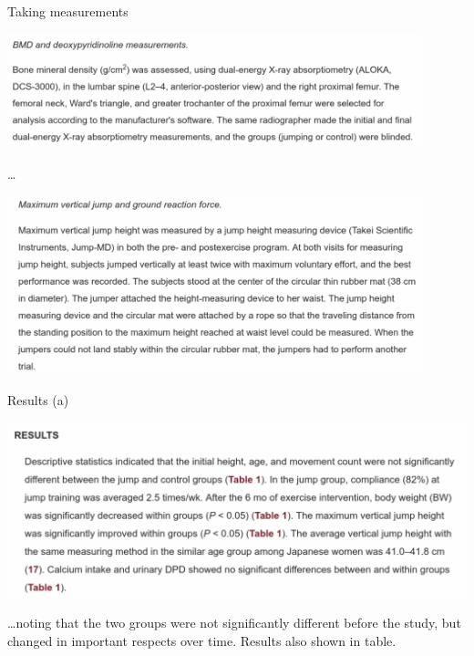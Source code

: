\documentclass[ignorenonframetext,]{beamer}
\begin{document}
\begin{frame}{Taking measurements}
\protect\hypertarget{taking-measurements}{}

\includegraphics[width=0.9\textwidth]{measurements}

\ldots{}

\includegraphics[width=0.9\textwidth]{measurementb}

\end{frame}

\begin{frame}{Results (a)}
\protect\hypertarget{results-a}{}

\includegraphics[width=\textwidth]{resultsa}

\ldots{}noting that the two groups were not significantly different
before the study, but changed in important respects over time. Results
also shown in table.

\end{frame}
\end{document}
